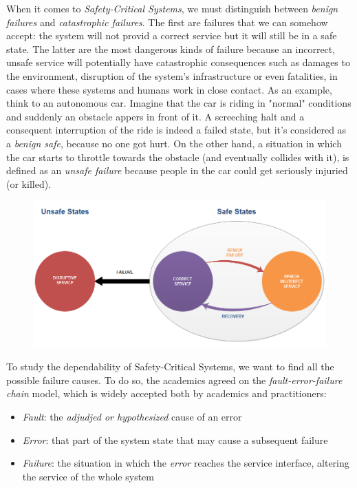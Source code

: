 When it comes to \textsl{Safety-Critical Systems}, we must distinguish between \textsl{benign failures} and \textsl{catastrophic failures}.
The first are failures that we can somehow accept: the system will not provid a correct service but it will still be in a safe state. The latter are the most dangerous kinds of failure because an incorrect, unsafe service will potentially have catastrophic consequences such as damages to the environment, disruption of the system's infrastructure or even fatalities, in cases where these systems and humans work in close contact.
As an example, think to an autonomous car. Imagine that the car is riding in "normal" conditions and suddenly an obstacle appers in front of it. A screeching halt and a consequent interruption of the ride is indeed a failed state, but it's considered as a \textsl{benign safe}, because no one got hurt. On the other hand, a situation in which the car starts to throttle towards the obstacle (and eventually collides with it), is defined as an \textsl{unsafe failure} because people in the car could get seriously injuried (or killed).
\newpage

\begin{figure}[h!]
	\includegraphics[width=\textwidth]{img/safe-unsafe.png}
	\caption{}
\end{figure}

To study the dependability of Safety-Critical Systems, we want to find all the possible failure causes. To do so, the academics agreed on the \textsl{fault-error-failure chain} model, which is widely accepted both by academics and practitioners:

\begin{itemize}
	\item \textsl{Fault}: the \textsl{adjudjed or hypothesized} cause of an error
	\item \textsl{Error}: that part of the system state that may cause a subsequent failure
	\item \textsl{Failure}: the situation in which the \textsl{error} reaches the service interface, altering the service of the whole system
\end{itemize}

